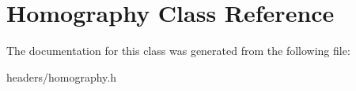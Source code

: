 \hypertarget{class_homography}{\section{Homography Class Reference}
\label{class_homography}
}


The documentation for this class was generated from the following file\-:\begin{DoxyCompactItemize}
\item 
headers/homography.\-h\end{DoxyCompactItemize}
